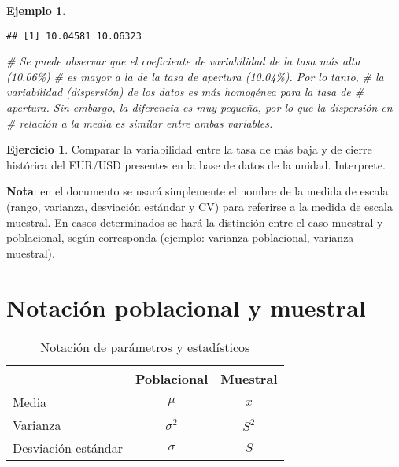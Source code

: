 \documentclass[
]{book}
\newenvironment{Shaded}{\begin{snugshade}}{\end{snugshade}}
\newcommand{\CommentTok}[1]{\textcolor[rgb]{0.56,0.35,0.01}{\textit{#1}}}
\theoremstyle{definition}
\theoremstyle{definition}
\newtheorem{example}{Ejemplo}[chapter]
\theoremstyle{definition}
\newtheorem{exercise}{Ejercicio}[chapter]
\theoremstyle{definition}
\theoremstyle{remark}
\begin{document}
\begin{example}
\begin{verbatim}
## [1] 10.04581 10.06323
\end{verbatim}

\begin{Shaded}
\begin{Highlighting}[]
\CommentTok{\# Se puede observar que el coeficiente de variabilidad de la tasa más alta (10.06\%)}
\CommentTok{\# es mayor a la de la tasa de apertura (10.04\%). Por lo tanto, }
\CommentTok{\# la variabilidad (dispersión) de los datos es más homogénea para la tasa de}
\CommentTok{\# apertura. Sin embargo, la diferencia es muy pequeña, por lo que la dispersión en }
\CommentTok{\# relación a la media es similar entre ambas variables.}
\end{Highlighting}
\end{Shaded}

\end{example}

\begin{exercise}
Comparar la variabilidad entre la tasa de más baja y de cierre histórica del EUR/USD presentes en la base de datos de la unidad. Interprete.
\end{exercise}

\textbf{Nota}: en el documento se usará simplemente el nombre de la medida de escala (rango, varianza, desviación estándar y CV) para referirse a la medida de escala muestral. En casos determinados se hará la distinción entre el caso muestral y poblacional, según corresponda (ejemplo: varianza poblacional, varianza muestral).

\hypertarget{notaciuxf3n-poblacional-y-muestral}{%
\section*{Notación poblacional y muestral}\label{notaciuxf3n-poblacional-y-muestral}}

\begin{table}[H]

\caption{\label{tab:notacion}Notación de parámetros y estadísticos}
\centering
\begin{tabular}[t]{lcc}
\toprule
  & Poblacional & Muestral\\
\midrule
Media & $\mu$ & $\bar{x}$\\
Varianza & $\sigma^2$ & $S^2$\\
Desviación estándar & $\sigma$ & $S$\\
\bottomrule
\end{tabular}
\end{table}
\end{document}
